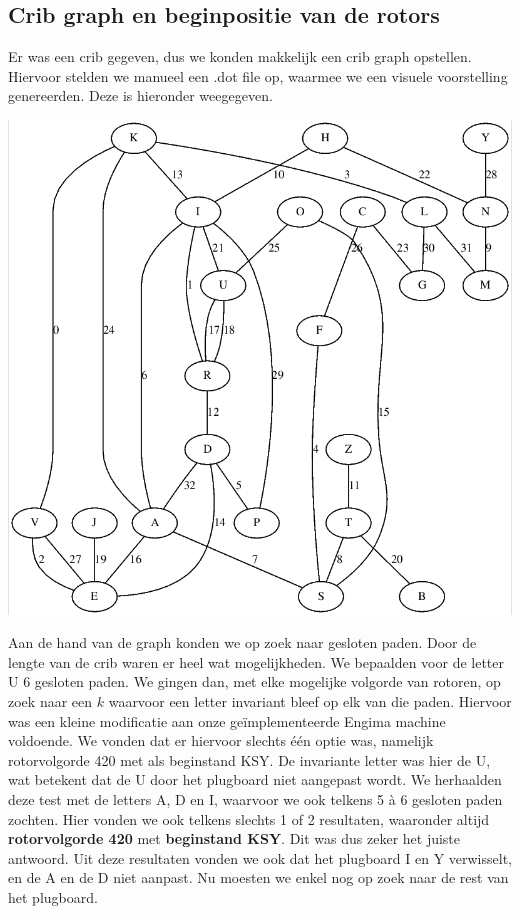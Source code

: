 \subsection{Crib graph en beginpositie van de rotors}
Er was een crib gegeven, dus we konden makkelijk een crib graph opstellen. Hiervoor stelden we manueel een .dot file op, waarmee we een visuele voorstelling genereerden. Deze is hieronder weegegeven. \\
\begin{center}
\includegraphics[scale=0.25]{enigma/graph.png}
\end{center}  
Aan de hand van de graph konden we op zoek naar gesloten paden. Door de lengte van de crib waren er heel wat mogelijkheden. We bepaalden voor de letter U 6 gesloten paden. We gingen dan, met elke mogelijke volgorde van rotoren, op zoek naar een $k$ waarvoor een letter invariant bleef op elk van die paden. Hiervoor was een kleine modificatie aan onze ge\"implementeerde Engima machine voldoende. We vonden dat er hiervoor slechts \'e\'en optie was, namelijk rotorvolgorde 420 met als beginstand KSY. De invariante letter was hier de U, wat betekent dat de U door het plugboard niet aangepast wordt. We herhaalden deze test met de letters A, D en I, waarvoor we ook telkens 5 \`a 6 gesloten paden zochten. Hier vonden we ook telkens slechts 1 of 2 resultaten, waaronder altijd \textbf{rotorvolgorde 420} met \textbf{beginstand KSY}. Dit was dus zeker het juiste antwoord. Uit deze resultaten vonden we ook dat het plugboard I en Y verwisselt, en de A en de D niet aanpast. Nu moesten we enkel nog op zoek naar de rest van het plugboard. 

